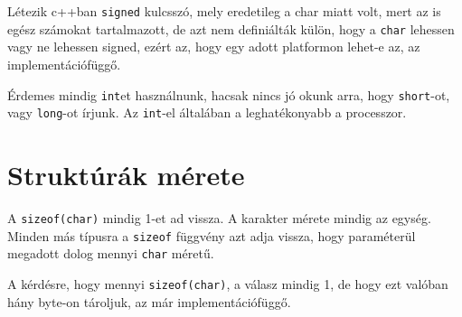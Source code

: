 \documentclass[a4paper,11.5pt]{article}
\begin{document}
	Létezik c++ban \texttt{signed} kulcsszó, mely eredetileg a char miatt volt, mert az is egész számokat tartalmazott, de azt nem definiálták külön, hogy a \texttt{char} lehessen vagy ne lehessen signed, ezért az, hogy egy adott platformon lehet-e az, az implementációfüggő.
	\begin{note}
		Érdemes mindig \texttt{int}et használnunk, hacsak nincs jó okunk arra, hogy \texttt{short}-ot, vagy \texttt{long}-ot írjunk. Az \texttt{int}-el általában a leghatékonyabb a processzor.
	\end{note}
	\section{Struktúrák mérete}
	A \texttt{sizeof(char)} mindig 1-et ad vissza. A karakter mérete mindig az egység. Minden más típusra a \texttt{sizeof} függvény azt adja vissza, hogy paraméterül megadott dolog mennyi \texttt{char} méretű. 
	
	A kérdésre, hogy mennyi \texttt{sizeof(char)}, a válasz mindig 1, de hogy ezt valóban hány byte-on tároljuk, az már implementációfüggő.
	
\end{document}
